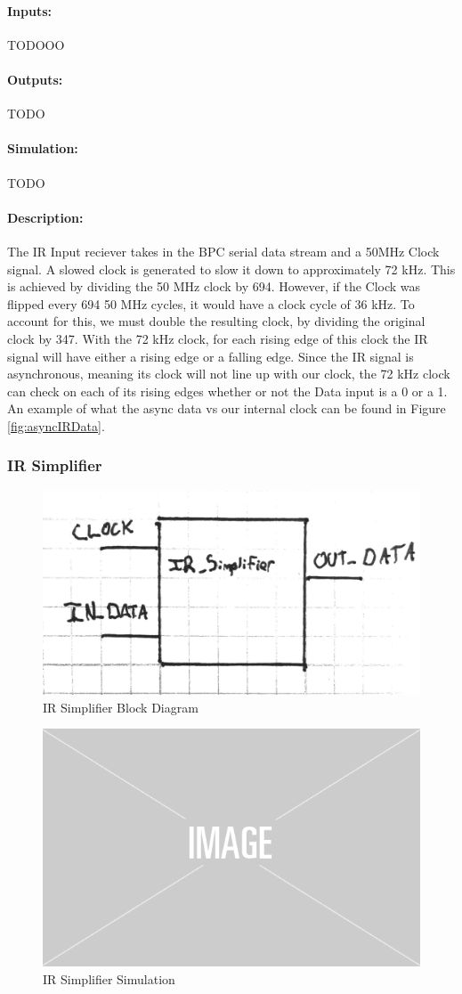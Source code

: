 \documentclass[]{article}
\begin{document}
\paragraph{Inputs:} TODOOO
\paragraph{Outputs:} TODO
\paragraph{Simulation:} TODO 
\paragraph{Description:} The IR Input reciever takes in the BPC serial data stream and a 50MHz Clock signal. A slowed clock is generated to slow it down to approximately 72 kHz.
This is achieved by dividing the 50 MHz clock by 694. However, if the Clock was flipped every 694 50 MHz cycles, it would have a clock cycle of 36 kHz. 
To account for this, we must double the resulting clock, by dividing the original clock by 347.
With the 72 kHz clock, for each rising edge of this clock the IR signal will have either a rising edge or a falling edge. 
Since the IR signal is asynchronous, meaning its clock will not line up with our clock, the 72 kHz clock can check on each of its rising edges whether or not the Data input is a 0 or a 1.
An example of what the async data vs our internal clock can be found in Figure \ref{fig:asyncIRData}.

\subsubsection{IR Simplifier}
\begin{figure}[H]\centering
    \includegraphics[width=0.6\linewidth]{figures/IR_Simplifier_Block.jpg}
    \caption{IR Simplifier Block Diagram}
    \label{fig:irSimplifierBlock}
\end{figure}
\begin{figure}[H]\centering
    \includegraphics[width=0.5\linewidth]{figures/placeholder.png}
    \caption{IR Simplifier Simulation}
    \label{fig:irSimplifierSim}
\end{figure}
\end{document}
